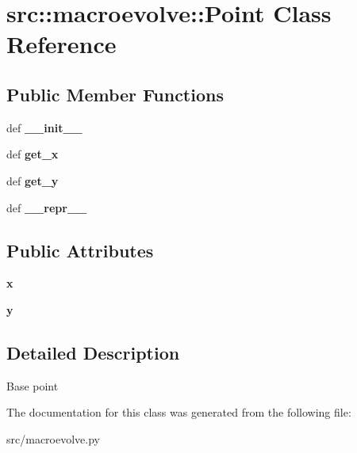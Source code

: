 \hypertarget{classsrc_1_1macroevolve_1_1Point}{
\section{src::macroevolve::Point Class Reference}
\label{classsrc_1_1macroevolve_1_1Point}
}
\subsection*{Public Member Functions}
\begin{DoxyCompactItemize}
\item 
\hypertarget{classsrc_1_1macroevolve_1_1Point_aff91a8b8972b4894e3a971b899031c20}{
def {\bfseries \_\-\_\-init\_\-\_\-}}
\label{classsrc_1_1macroevolve_1_1Point_aff91a8b8972b4894e3a971b899031c20}

\item 
\hypertarget{classsrc_1_1macroevolve_1_1Point_ae5bf3db9a4ea267050a018fcaeef06fd}{
def {\bfseries get\_\-x}}
\label{classsrc_1_1macroevolve_1_1Point_ae5bf3db9a4ea267050a018fcaeef06fd}

\item 
\hypertarget{classsrc_1_1macroevolve_1_1Point_a176f3a598e0890554d9c3c0effea3ebb}{
def {\bfseries get\_\-y}}
\label{classsrc_1_1macroevolve_1_1Point_a176f3a598e0890554d9c3c0effea3ebb}

\item 
\hypertarget{classsrc_1_1macroevolve_1_1Point_a28cfe50c5e6d0d2f909b5afd79f7255a}{
def {\bfseries \_\-\_\-repr\_\-\_\-}}
\label{classsrc_1_1macroevolve_1_1Point_a28cfe50c5e6d0d2f909b5afd79f7255a}

\end{DoxyCompactItemize}
\subsection*{Public Attributes}
\begin{DoxyCompactItemize}
\item 
\hypertarget{classsrc_1_1macroevolve_1_1Point_acb22f56d739de85e33bc392bc1dcb25d}{
{\bfseries x}}
\label{classsrc_1_1macroevolve_1_1Point_acb22f56d739de85e33bc392bc1dcb25d}

\item 
\hypertarget{classsrc_1_1macroevolve_1_1Point_a04c6dd7b8f446bc58cf9c82586752569}{
{\bfseries y}}
\label{classsrc_1_1macroevolve_1_1Point_a04c6dd7b8f446bc58cf9c82586752569}

\end{DoxyCompactItemize}


\subsection{Detailed Description}
\begin{DoxyVerb}
Base point
\end{DoxyVerb}
 

The documentation for this class was generated from the following file:\begin{DoxyCompactItemize}
\item 
src/macroevolve.py\end{DoxyCompactItemize}
